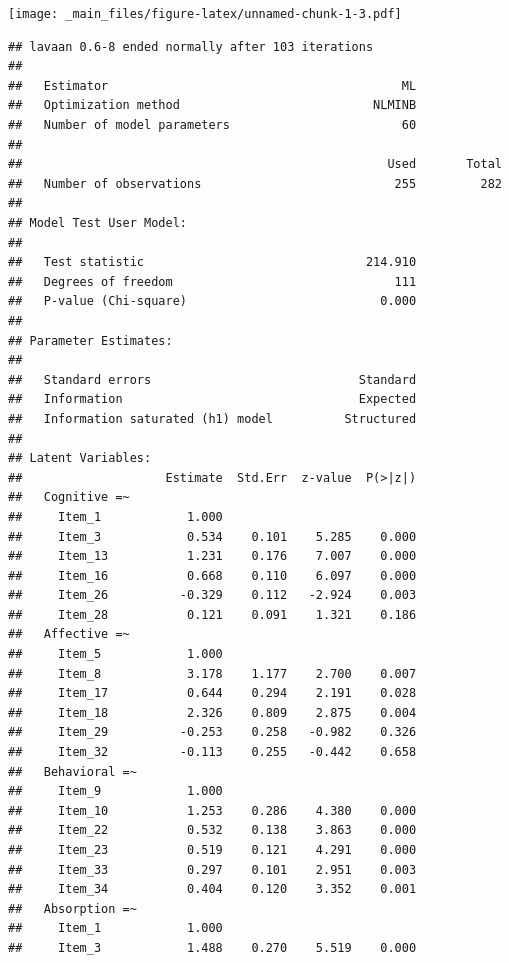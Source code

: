 \documentclass[
]{book}
\begin{document}
\texttt{[image: \_main\_files/figure-latex/unnamed-chunk-1-3.pdf]}

\begin{verbatim}
## lavaan 0.6-8 ended normally after 103 iterations
## 
##   Estimator                                         ML
##   Optimization method                           NLMINB
##   Number of model parameters                        60
##                                                       
##                                                   Used       Total
##   Number of observations                           255         282
##                                                                   
## Model Test User Model:
##                                                       
##   Test statistic                               214.910
##   Degrees of freedom                               111
##   P-value (Chi-square)                           0.000
## 
## Parameter Estimates:
## 
##   Standard errors                             Standard
##   Information                                 Expected
##   Information saturated (h1) model          Structured
## 
## Latent Variables:
##                    Estimate  Std.Err  z-value  P(>|z|)
##   Cognitive =~                                        
##     Item_1            1.000                           
##     Item_3            0.534    0.101    5.285    0.000
##     Item_13           1.231    0.176    7.007    0.000
##     Item_16           0.668    0.110    6.097    0.000
##     Item_26          -0.329    0.112   -2.924    0.003
##     Item_28           0.121    0.091    1.321    0.186
##   Affective =~                                        
##     Item_5            1.000                           
##     Item_8            3.178    1.177    2.700    0.007
##     Item_17           0.644    0.294    2.191    0.028
##     Item_18           2.326    0.809    2.875    0.004
##     Item_29          -0.253    0.258   -0.982    0.326
##     Item_32          -0.113    0.255   -0.442    0.658
##   Behavioral =~                                       
##     Item_9            1.000                           
##     Item_10           1.253    0.286    4.380    0.000
##     Item_22           0.532    0.138    3.863    0.000
##     Item_23           0.519    0.121    4.291    0.000
##     Item_33           0.297    0.101    2.951    0.003
##     Item_34           0.404    0.120    3.352    0.001
##   Absorption =~                                       
##     Item_1            1.000                           
##     Item_3            1.488    0.270    5.519    0.000

\end{verbatim}
\end{document}
